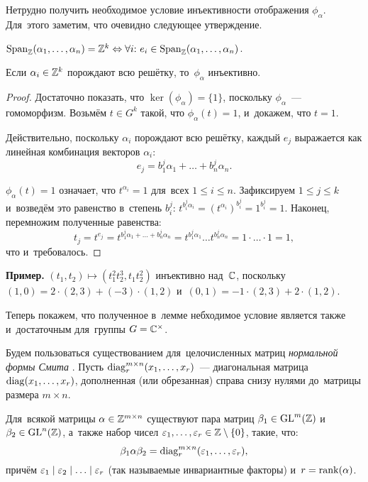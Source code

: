 \documentclass[a4paper,oneside]{article}
\begin{document}
Нетрудно получить необходимое условие инъективности отображения $\phi_\alpha$.
Для~этого заметим, что очевидно следующее утверждение.

\begin{statement*}
    $\mathrm{Span}_{\mathbb{Z}}(\alpha_1, \ldots, \alpha_n) = \mathbb{Z}^k \Leftrightarrow \forall i{:}\ e_i \in \mathrm{Span}_{\mathbb{Z}}(\alpha_1, \ldots, \alpha_n)$.
\end{statement*}

\begin{lemma}
    Если $\alpha_i \in \mathbb{Z}^k$ порождают всю решётку, то~$\phi_\alpha$ инъективно.
\end{lemma}

\begin{proof}
    Достаточно показать, что $\ker(\phi_\alpha) = \{1\}$, поскольку $\phi_\alpha$~— гомоморфизм.
    Возьмём $t \in G^k$ такой, что $\phi_\alpha(t) = 1$, и~докажем, что $t = 1$.

    Действительно, поскольку $\alpha_i$ порождают всю решётку, каждый $e_j$ выражается как линейная комбинация векторов $\alpha_i$:
    $$
        e_j = b^j_1 \alpha_1 + \ldots + b^j_n \alpha_n.
    $$

    $\phi_\alpha(t) = 1$ означает, что $t^{\alpha_i} = 1$ для~всех $1 \leq i \leq n$.
    Зафиксируем $1 \leq j \leq k$ и~возведём это равенство в~степень $b^j_i$: $t^{b^j_i \alpha_i} = (t^{\alpha_i})^{b^j_i} = 1^{b^j_i} = 1$.
    Наконец, перемножим полученные равенства:
    $$
        t_j = t^{e_j} = t^{b^j_1 \alpha_1 + \ldots + b^j_n \alpha_n} = t^{b^j_1 \alpha_1} \ldots t^{b^j_n \alpha_n} = 1 \cdot \ldots \cdot 1 = 1,
    $$
    что и~требовалось.
\end{proof}

\noindent\textbf{Пример.} $(t_1, t_2) \mapsto (t_1^2 t_2^3, t_1 t_2^2)$ инъективно над~$\mathbb{C}$,
поскольку $(1, 0) = 2 \cdot (2, 3) + (-3) \cdot (1, 2)$ и~$(0, 1) = -1 \cdot (2, 3) + 2 \cdot (1, 2)$.
\medskip

Теперь покажем, что полученное в~лемме небходимое условие является также и~достаточным для~группы $G = \mathbb{C}^\times$.

Будем пользоваться существованием для~целочисленных матриц \textit{нормальной формы Смита} \cite{Smth60}.
Пусть $\mathrm{diag}^{m \times n}_r(x_1, \ldots, x_r)$~— диагональная матрица $\mathrm{diag}(x_1, \ldots, x_r)$,
дополненная (или обрезанная) справа снизу нулями до~матрицы размера $m \times n$.

\begin{theorem*}
    Для~всякой матрицы $\alpha \in \mathbb{Z}^{m \times n}$ существуют
    пара матриц $\beta_1 \in \mathrm{GL}^m(\mathbb{Z})$ и~$\beta_2 \in \mathrm{GL}^n(\mathbb{Z})$,
    а~также набор чисел $\varepsilon_1, \ldots, \varepsilon_r \in \mathbb{Z} \setminus \{0\}$,
    такие, что:
    $$
        \beta_1 \alpha \beta_2 = \mathrm{diag}^{m \times n}_r(\varepsilon_1, \ldots, \varepsilon_r),
    $$
    причём $\varepsilon_1 \mid \varepsilon_2 \mid \ldots \mid \varepsilon_r$ (так называемые инвариантные факторы) и~$r = \mathrm{rank}(\alpha)$.
\end{theorem*}
\end{document}

